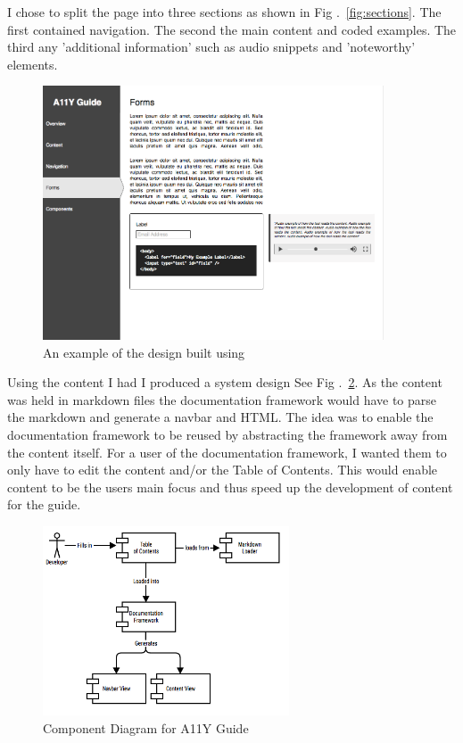 I chose to split the page into three sections as shown in Fig
.~\ref{fig:sections}. The first contained navigation. The second the main
content and coded examples. The third any 'additional information' such as
audio snippets and 'noteworthy' elements.

\begin{figure}[H]
\centering
\includegraphics[width=0.9\textwidth]{figures/a11y_guide_design}
\captionsetup{justification=centering}
\caption{An example of the design built using \cite*{Moqups}
\label{fig:a11y_guide_design}}
\end{figure}

Using the content I had I produced a system design See Fig
.~\ref{fig:allycomponent}. As the content was held in markdown files the
documentation framework would have to parse the markdown and generate a
navbar and HTML. The idea was to enable the documentation framework to be
reused by abstracting the framework away from the content itself. For a user
of the documentation framework, I wanted them to only have to edit the
content and/or the Table of Contents. This would enable content to be the
users main focus and thus speed up the development of content for the guide.

\begin{figure}[H]
\centering
\includegraphics[width=0.65\textwidth]{figures/documentation_design}
\captionsetup{justification=centering}
\caption{Component Diagram for A11Y Guide
\label{fig:allycomponent}}
\end{figure}

